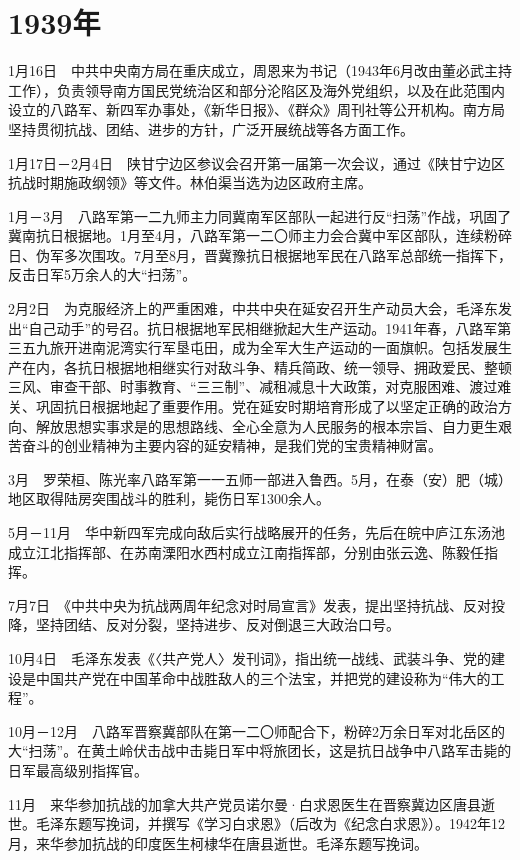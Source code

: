 \documentclass[10pt,a4paper,twocolumn]{book}
\begin{document}
\section{1939年}

1月16日　中共中央南方局在重庆成立，周恩来为书记（1943年6月改由董必武主持工作），负责领导南方国民党统治区和部分沦陷区及海外党组织，以及在此范围内设立的八路军、新四军办事处，《新华日报》、《群众》周刊社等公开机构。南方局坚持贯彻抗战、团结、进步的方针，广泛开展统战等各方面工作。

1月17日－2月4日　陕甘宁边区参议会召开第一届第一次会议，通过《陕甘宁边区抗战时期施政纲领》等文件。林伯渠当选为边区政府主席。

1月－3月　八路军第一二九师主力同冀南军区部队一起进行反“扫荡”作战，巩固了冀南抗日根据地。1月至4月，八路军第一二〇师主力会合冀中军区部队，连续粉碎日、伪军多次围攻。7月至8月，晋冀豫抗日根据地军民在八路军总部统一指挥下，反击日军5万余人的大“扫荡”。

2月2日　为克服经济上的严重困难，中共中央在延安召开生产动员大会，毛泽东发出“自己动手”的号召。抗日根据地军民相继掀起大生产运动。1941年春，八路军第三五九旅开进南泥湾实行军垦屯田，成为全军大生产运动的一面旗帜。包括发展生产在内，各抗日根据地相继实行对敌斗争、精兵简政、统一领导、拥政爱民、整顿三风、审查干部、时事教育、“三三制”、减租减息十大政策，对克服困难、渡过难关、巩固抗日根据地起了重要作用。党在延安时期培育形成了以坚定正确的政治方向、解放思想实事求是的思想路线、全心全意为人民服务的根本宗旨、自力更生艰苦奋斗的创业精神为主要内容的延安精神，是我们党的宝贵精神财富。

3月　罗荣桓、陈光率八路军第一一五师一部进入鲁西。5月，在泰（安）肥（城）地区取得陆房突围战斗的胜利，毙伤日军1300余人。

5月－11月　华中新四军完成向敌后实行战略展开的任务，先后在皖中庐江东汤池成立江北指挥部、在苏南溧阳水西村成立江南指挥部，分别由张云逸、陈毅任指挥。

7月7日　《中共中央为抗战两周年纪念对时局宣言》发表，提出坚持抗战、反对投降，坚持团结、反对分裂，坚持进步、反对倒退三大政治口号。

10月4日　毛泽东发表《〈共产党人〉发刊词》，指出统一战线、武装斗争、党的建设是中国共产党在中国革命中战胜敌人的三个法宝，并把党的建设称为“伟大的工程”。

10月－12月　八路军晋察冀部队在第一二〇师配合下，粉碎2万余日军对北岳区的大“扫荡”。在黄土岭伏击战中击毙日军中将旅团长，这是抗日战争中八路军击毙的日军最高级别指挥官。

11月　来华参加抗战的加拿大共产党员诺尔曼·白求恩医生在晋察冀边区唐县逝世。毛泽东题写挽词，并撰写《学习白求恩》（后改为《纪念白求恩》）。1942年12月，来华参加抗战的印度医生柯棣华在唐县逝世。毛泽东题写挽词。
\end{document}
